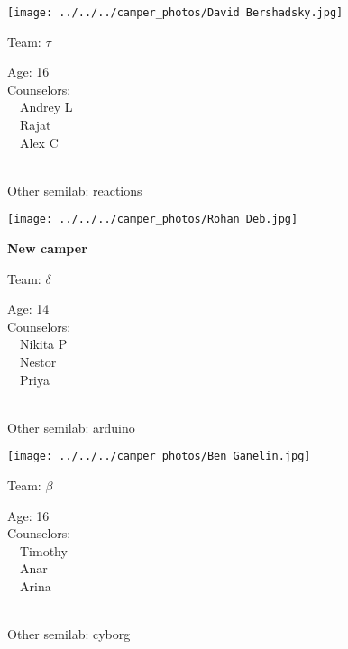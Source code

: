\documentclass[10pt,letterpaper, landscape]{article}
\begin{document}
\verticalshiftfornextsticker
\renewcommand{\baselinestretch}{1} \begin{sticker}
\noindent\begin{minipage}{0.5\textwidth}\texttt{[image: ../../../camper\_photos/David Bershadsky.jpg]}\end{minipage}\begin{minipage}{0.45\textwidth}
Team: {\Large $\tau$}

Age:        16\\
Counselors: \\\ \ Andrey L\\\ \ Rajat\\\ \ Alex C\\
\end{minipage} \\ \vspace{0.07in}
Other semilab: reactions
\end{sticker}
\horizontalshiftfornextsticker
\renewcommand{\baselinestretch}{1} \begin{sticker}
\noindent\begin{minipage}{0.5\textwidth}\texttt{[image: ../../../camper\_photos/Rohan Deb.jpg]}\end{minipage}\begin{minipage}{0.45\textwidth}
\textbf{New camper} 

Team: {\Large $\delta$}

Age:        14\\
Counselors: \\\ \ Nikita P\\\ \ Nestor\\\ \ Priya\\
\end{minipage} \\ \vspace{0.07in}
Other semilab: arduino
\end{sticker}
\horizontalshiftfornextsticker
\renewcommand{\baselinestretch}{1} \begin{sticker}
\noindent\begin{minipage}{0.5\textwidth}\texttt{[image: ../../../camper\_photos/Ben Ganelin.jpg]}\end{minipage}\begin{minipage}{0.45\textwidth}
Team: {\Large $\beta$}

Age:        16\\
Counselors: \\\ \ Timothy\\\ \ Anar\\\ \ Arina\\
\end{minipage} \\ \vspace{0.07in}
Other semilab: cyborg
\end{sticker}
\end{document}
